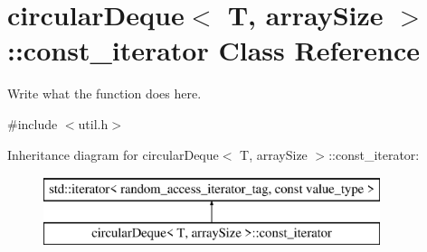 \hypertarget{classcircularDeque_1_1const__iterator}{\section{circular\+Deque$<$ T, array\+Size $>$\+:\+:const\+\_\+iterator Class Reference}
\label{classcircularDeque_1_1const__iterator}
}


Write what the function does here.  




{\ttfamily \#include $<$util.\+h$>$}

Inheritance diagram for circular\+Deque$<$ T, array\+Size $>$\+:\+:const\+\_\+iterator\+:\begin{figure}[H]
\begin{center}
\leavevmode
\includegraphics[height=2.000000cm]{classcircularDeque_1_1const__iterator}
\end{center}
\end{figure}
